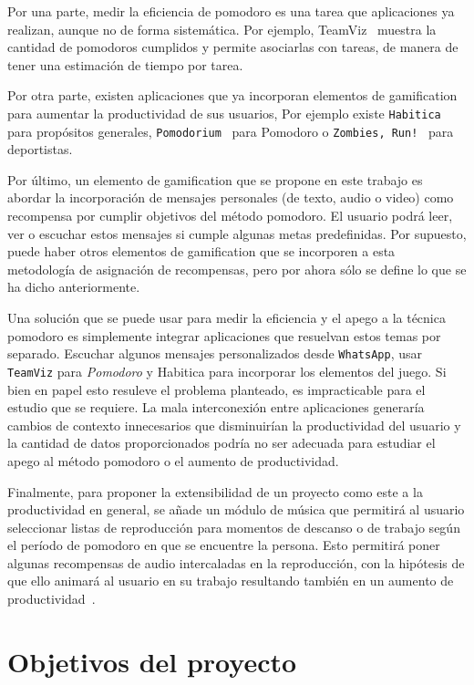\documentclass[12pt,letterpaper]{report}
\begin{document}
Por una parte, medir la eficiencia de pomodoro es una tarea que aplicaciones ya realizan, aunque no de forma
sistemática. Por ejemplo, TeamViz~\cite{teamviz} muestra la cantidad de pomodoros cumplidos y permite asociarlas con
tareas, de manera de tener una estimación de tiempo por tarea.

Por otra parte, existen aplicaciones que ya incorporan elementos de gamification para aumentar la productividad de sus
usuarios, Por ejemplo existe \texttt{Habitica}~\cite{habitica} para propósitos generales,
\texttt{Pomodorium}~\cite{pomodorium} para Pomodoro o \texttt{Zombies, Run!}~\cite{zombiesrun} para deportistas.

Por último, un elemento de gamification que se propone en este trabajo es abordar la incorporación de mensajes
personales (de texto, audio o video) como recompensa por cumplir objetivos del método pomodoro. El usuario podrá leer,
ver o escuchar estos mensajes si cumple algunas metas predefinidas. Por supuesto, puede haber otros elementos de
gamification que se incorporen a esta metodología de asignación de recompensas, pero por ahora sólo se define lo que se
ha dicho anteriormente.

Una solución que se puede usar para medir la eficiencia y el apego a la técnica pomodoro es simplemente integrar
aplicaciones que resuelvan estos temas por separado. Escuchar algunos mensajes personalizados desde \texttt{WhatsApp},
usar \texttt{TeamViz} para \emph{Pomodoro} y Habitica para incorporar los elementos del juego. Si bien en papel esto
resuleve el problema planteado, es impracticable para el estudio que se requiere. La mala interconexión entre
aplicaciones generaría cambios de contexto innecesarios que disminuirían la productividad del usuario y la cantidad de
datos proporcionados podría no ser adecuada para estudiar el apego al método pomodoro o el aumento de productividad.

Finalmente, para proponer la extensibilidad de un proyecto como este a la productividad en general, se añade un módulo
de música que permitirá al usuario seleccionar listas de reproducción para momentos de descanso o de trabajo según el
período de pomodoro en que se encuentre la persona. Esto permitirá poner algunas recompensas de audio intercaladas en la
reproducción, con la hipótesis de que ello animará al usuario en su trabajo resultando también en un aumento de
productividad~\cite{hallam2002effects}.

\newpage
\section{Objetivos del proyecto}\label{objetivos-del-proyecto}
\end{document}
